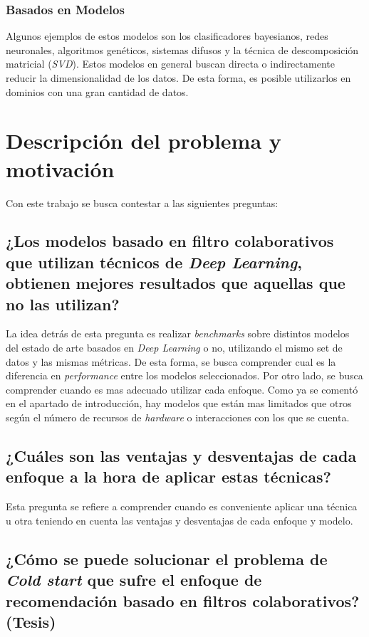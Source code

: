 \documentclass[11pt,a4paper,twoside]{thesis}
\begin{document}
\subsubsection{Basados en Modelos}

Algunos ejemplos de estos modelos son los clasificadores bayesianos, redes
neuronales, algoritmos genéticos, sistemas difusos y la técnica de
descomposición matricial (\textit{SVD}). Estos modelos en general buscan
directa o indirectamente reducir la dimensionalidad de los datos. De esta
forma, es posible utilizarlos en dominios con una gran cantidad de datos.

\clearpage
\section{Descripción del problema y motivación}

Con este trabajo se busca contestar a las siguientes preguntas:

\subsection{¿Los modelos basado en filtro colaborativos que utilizan técnicos de \textit{Deep Learning}, obtienen mejores resultados que aquellas que no las utilizan?}

La idea detrás de esta pregunta es realizar \textit{benchmarks} sobre distintos
modelos del estado de arte basados en \textit{Deep Learning} o no, utilizando
el mismo set de datos y las mismas métricas. De esta forma, se busca comprender
cual es la diferencia en \textit{performance} entre los modelos seleccionados.
Por otro lado, se busca comprender cuando es mas adecuado utilizar cada
enfoque. Como ya se comentó en el apartado de introducción, hay modelos que
están mas limitados que otros según el número de recursos de \textit{hardware}
o interacciones con los que se cuenta.

\subsection{¿Cuáles son las ventajas y desventajas de cada enfoque a la hora de aplicar estas técnicas?}

Esta pregunta se refiere a comprender cuando es conveniente aplicar una técnica
u otra teniendo en cuenta las ventajas y desventajas de cada enfoque y modelo.

\subsection{¿Cómo se puede solucionar el problema de \textit{Cold start}
	que sufre el enfoque de recomendación basado en filtros colaborativos? (Tesis)}
\end{document}
